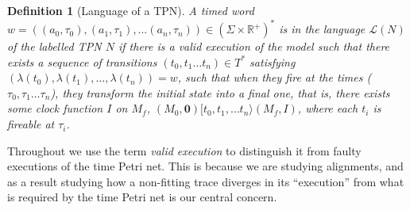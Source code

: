 \documentclass[conference]{IEEEtran}
\newtheorem{definition}{Definition}
\begin{document}
    
    \begin{definition}[Language of a TPN]
        A timed word $w = ((a_0, \tau_0), (a_1, \tau_1), \dots (a_n, \tau_n)) \in (\Sigma \times \mathbb{R}^+)^*$ is in the language $\mathcal{L}(N)$ of the labelled TPN $N$ if there is a valid execution of the model such that there exists a sequence of transitions $(t_0, t_1 \dots t_n) \in T^*$ satisfying $(\lambda(t_0),\lambda( t_1), \dots,\lambda (t_n)) = w $, such that when they fire at the times ($\tau_0, \tau_1 \dots \tau_n$), they transform the initial state into a final one, that is, there exists some clock function $I$ on $M_f$, $(M_0, \mathbf{0}) [t_0, t_1, \dots t_n\rangle (M_f, I)$, where each $t_i$ is fireable at $\tau_i$. 
    \end{definition}
    
Throughout we use the term \textit{valid execution} to distinguish it from faulty executions of the time Petri net. This is because we are studying alignments, and as a result studying how a non-fitting trace diverges in its ``execution'' from what is required by the time Petri net is our central concern. 
\end{document}
